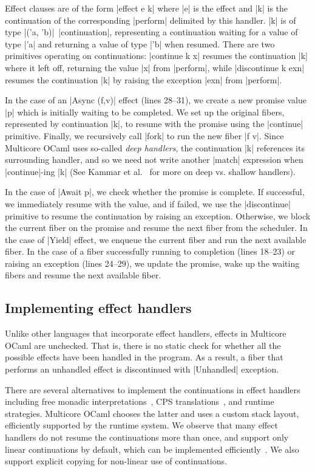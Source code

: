 \documentclass{llncs}
\begin{document}
Effect clauses are of the form |effect e k| where |e| is the effect and |k| is
the continuation of the corresponding |perform| delimited by this handler. |k|
is of type |('a, 'b)|~|continuation|, representing a continuation waiting for
a value of type |'a| and returning a value of type |'b| when resumed. There are
two primitives operating on continuations: |continue k x| resumes the
continuation |k| where it left off, returning the value |x| from |perform|,
while |discontinue k exn| resumes the continuation |k| by raising the exception
|exn| from |perform|.

In the case of an |Async (f,v)| effect (lines 28--31), we create a new promise
value |p| which is initially waiting to be completed. We set up the original
fibers, represented by continuation |k|, to resume with the promise using the
|continue| primitive. Finally, we recursively call |fork| to run the new fiber
|f v|. Since Multicore OCaml uses so-called \emph{deep handlers}, the
continuation |k| references its surrounding handler, and so we need not write
another |match| expression when |continue|-ing |k| (See Kammar et
al.~\citep*{KammarLO13} for more on deep vs. shallow handlers).

In the case of |Await p|, we check whether the promise is complete. If
successful, we immediately resume with the value, and if failed, we use the
|discontinue| primitive to resume the continuation by raising an exception.
Otherwise, we block the current fiber on
the promise and resume the next fiber from the scheduler. In the case of
|Yield| effect, we enqueue the current fiber and run the next available fiber.
In the case of a fiber successfully running to completion (lines 18--23) or
raising an exception (lines 24--29), we update the promise, wake up the waiting
fibers and resume the next available fiber.

\subsection{Implementing effect handlers}

Unlike other languages that incorporate effect handlers, effects in Multicore
OCaml are unchecked. That is, there is no static check for whether all the
possible effects have been handled in the program. As a result, a fiber that
performs an unhandled effect is discontinued with |Unhandled| exception.

There are several alternatives to implement the continuations in effect
handlers including free monadic
interpretations~\citep*{KiselyovI15,KiselyovSS13,WuSH14}, CPS
translations~\citep*{HillerstromLAS17,Leijen17}, and runtime strategies.
Multicore OCaml chooses the latter and uses a custom stack
layout, efficiently supported by the runtime system.
We observe that many effect handlers do not resume the
continuations more than once, and support only linear continuations by
default, which can be implemented efficiently~\citep*{DolanWSYM15}. We also
support explicit copying for non-linear use of continuations.
\end{document}
